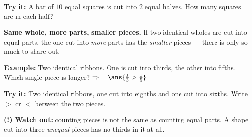 \documentclass[12pt]{article}
\begin{document}
\begin{tryitbox}
\textbf{Try it:} A bar of $10$ equal squares is cut into $2$ equal halves. How
many squares are in each half?\\[2pt]
\end{tryitbox}


\begin{formulabox}
\textbf{Same whole, more parts, smaller pieces.} If two identical wholes are
cut into equal parts, the one cut into \emph{more} parts has the
\emph{smaller} pieces --- there is only so much to share out.
\end{formulabox}

\begin{examplebox}
\textbf{Example:} Two identical ribbons. One is cut into thirds, the other into
fifths. Which single piece is longer?
$\Rightarrow\quad \ans{\tfrac{1}{3} > \tfrac{1}{5}}$
\end{examplebox}

\begin{tryitbox}
\textbf{Try it:} Two identical ribbons, one cut into eighths and one cut into
sixths. Write $>$ or $<$ between the two pieces.\\[2pt]
\end{tryitbox}

\begin{watchoutbox}
\textbf{(!) Watch out:} counting pieces is not the same as counting equal
parts. A shape cut into three \emph{unequal} pieces has no thirds in it at all.
\end{watchoutbox}
\end{document}
